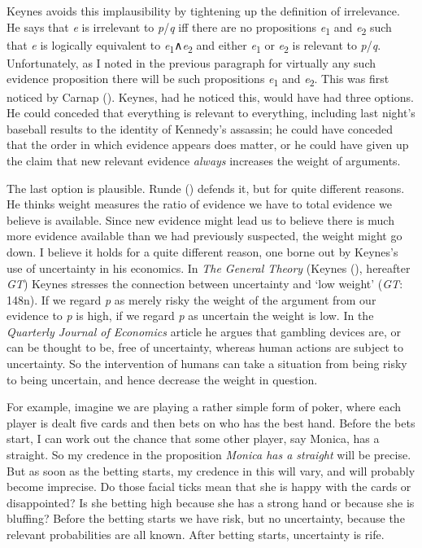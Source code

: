 \documentclass[
  10pt,
  letterpaper,
  DIV=11,
  numbers=noendperiod,
  twoside]{scrartcl}
\begin{document}
Keynes avoids this implausibility by tightening up the definition of
irrelevance. He says that \emph{e} is irrelevant to \emph{p}/\emph{q}
iff there are no propositions \emph{e}\textsubscript{1} and
\emph{e}\textsubscript{2} such that \emph{e} is logically equivalent to
\emph{e}\textsubscript{1}∧\emph{e}\textsubscript{2} and either
\emph{e}\textsubscript{1} or \emph{e}\textsubscript{2} is relevant to
\emph{p}/\emph{q}. Unfortunately, as I noted in the previous paragraph
for virtually any such evidence proposition there will be such
propositions \emph{e}\textsubscript{1} and \emph{e}\textsubscript{2}.
This was first noticed by Carnap ().
Keynes, had he noticed this, would have had three options. He could
conceded that everything is relevant to everything, including last
night's baseball results to the identity of Kennedy's assassin; he could
have conceded that the order in which evidence appears does matter, or
he could have given up the claim that new relevant evidence
\emph{always} increases the weight of arguments.

The last option is plausible. Runde ()
defends it, but for quite different reasons. He thinks weight measures
the ratio of evidence we have to total evidence we believe is available.
Since new evidence might lead us to believe there is much more evidence
available than we had previously suspected, the weight might go down. I
believe it holds for a quite different reason, one borne out by Keynes's
use of uncertainty in his economics. In \emph{The General Theory}
(Keynes (), hereafter \emph{GT}) Keynes
stresses the connection between uncertainty and `low weight' (\emph{GT}:
148n). If we regard \emph{p} as merely risky the weight of the argument
from our evidence to \emph{p} is high, if we regard \emph{p} as
uncertain the weight is low. In the \emph{Quarterly Journal of
Economics} article he argues that gambling devices are, or can be
thought to be, free of uncertainty, whereas human actions are subject to
uncertainty. So the intervention of humans can take a situation from
being risky to being uncertain, and hence decrease the weight in
question.

For example, imagine we are playing a rather simple form of poker, where
each player is dealt five cards and then bets on who has the best hand.
Before the bets start, I can work out the chance that some other player,
say Monica, has a straight. So my credence in the proposition
\emph{Monica has a straight} will be precise. But as soon as the betting
starts, my credence in this will vary, and will probably become
imprecise. Do those facial ticks mean that she is happy with the cards
or disappointed? Is she betting high because she has a strong hand or
because she is bluffing? Before the betting starts we have risk, but no
uncertainty, because the relevant probabilities are all known. After
betting starts, uncertainty is rife.
\end{document}
